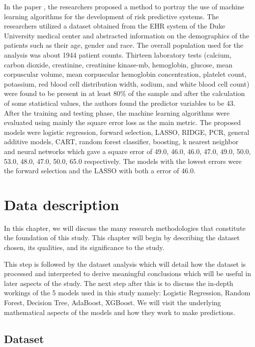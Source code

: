 \documentclass[12pt, a4paper,twoside]{report}
\numberwithin{equation}{chapter}
\begin{document}
In the paper \cite{goldstein2017moving}, the researchers proposed a method to portray the use of machine learning algorithms for the development of risk predictive systems. The researchers utilized a dataset obtained from the EHR system of the Duke University medical center and abstracted information on the demographics of the patients such as their age, gender and race. The overall population used for the analysis was about 1944 patient counts. Thirteen laboratory tests (calcium, carbon dioxide, creatinine, creatinine kinase-mb, hemoglobin, glucose, mean corpuscular volume, mean corpuscular hemoglobin concentration, platelet count, potassium, red blood cell distribution width, sodium, and white blood cell count) were found to be present in at least 80\% of the sample and after the calculation of some statistical values, the authors found the predictor variables to be 43. After the training and testing phase, the machine learning algorithms were evaluated using mainly the square error loss as the main metric. The proposed models were logistic regression, forward selection, LASSO, RIDGE, PCR, general additive models, CART, random forest classifier, boosting, k nearest neighbor and neural networks which gave a square error of 49.0, 46.0, 46.0, 47.0, 49.0, 50.0, 53.0, 48.0, 47.0, 50.0, 65.0 respectively. The models with the lowest errors were the forward selection and the LASSO with both a error of 46.0.


\chapter{Data description}
In this chapter, we will discuss the many research methodologies that constitute the foundation of this study. This chapter will begin by describing the dataset chosen, its qualities, and its significance to the study. 

This step is followed by the dataset analysis which will detail how the dataset is processed and interpreted to derive meaningful conclusions which will be useful in later aspects of the study.
The next step after this is to discuss the in-depth workings of the 5 models used in this study namely: Logistic Regression, Random Forest, Decision Tree, AdaBoost, XGBoost. We will visit the underlying mathematical aspects of the models and how they work to make predictions.

\section{Dataset}
\end{document}
